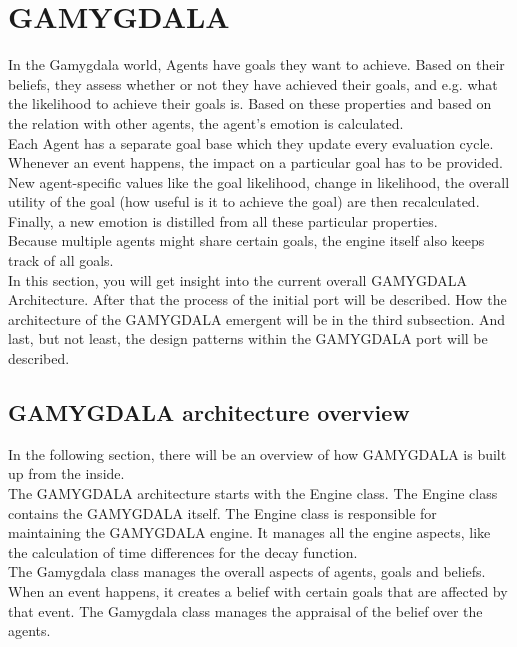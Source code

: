 \section{GAMYGDALA}
In the Gamygdala world, Agents have goals they want to achieve. Based on their beliefs, they assess whether or not they have achieved their goals, and e.g. what the likelihood to achieve their goals is. Based on these properties and based on the relation with other agents, the agent's emotion is calculated. \\ 

Each Agent has a separate goal base which they update every evaluation cycle. Whenever an event happens, the impact on a particular goal has to be provided. New agent-specific values like the goal likelihood, change in likelihood, the overall utility of the goal (how useful is it to achieve the goal) are then recalculated. Finally, a new emotion is distilled from all these particular properties. \\

Because multiple agents might share certain goals, the engine itself also keeps track of all goals. \\

In this section, you will get insight into the current overall GAMYGDALA Architecture. After that the process of the initial port will be described. How the architecture of the GAMYGDALA emergent will be in the third subsection. And last, but not least, the design patterns within the GAMYGDALA port will be described. 

\subsection{GAMYGDALA architecture overview}
In the following section, there will be an overview of how GAMYGDALA is built up from the inside. \\

The GAMYGDALA architecture starts with the Engine class. The Engine class contains the GAMYGDALA itself. The Engine class is responsible for maintaining the GAMYGDALA engine. It manages all the engine aspects, like the calculation of time differences for the decay function. \\

The Gamygdala class manages the overall aspects of agents, goals and beliefs. When an event happens, it creates a belief with certain goals that are affected by that event. The Gamygdala class manages the appraisal of the belief over the agents. \\

